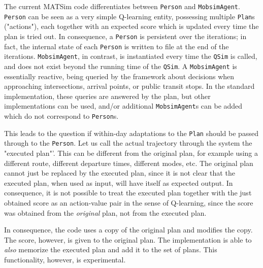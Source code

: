 
The current MATSim code differentiates between \lstinline$Person$ and \lstinline$MobsimAgent$.  
%
\lstinline$Person$ can be seen as a very simple Q-learning entity, possessing multiple \lstinline$Plan$s ("actions"), each together with an expected score which is updated every time the plan is tried out. In consequence, a \lstinline$Person$ is persistent over the iterations; in fact, the internal state of each \lstinline$Person$ is written to file at the end of the iterations.
%
\lstinline$MobsimAgent$, in contrast, is instantiated every time the \lstinline$QSim$ is called, and does not exist beyond the running time of the \lstinline$QSim$. A \lstinline$MobsimAgent$ is essentially reactive, being queried by the framework about decisions when approaching intersections, arrival points, or public transit stops. In the standard implementation, these queries are answered by the plan, but other implementations can be used, and/or additional \lstinline$MobsimAgent$s can be added which do not correspond to \lstinline$Person$s.


This leads to the question if within-day adaptations to the \lstinline$Plan$ should be passed through to the \lstinline$Person$. Let us call the actual trajectory through the system the "executed plan"'.  This can be different from the original plan, for example using a different route, different departure times, different modes, etc. The original plan cannot just be replaced by the executed plan, since it is not clear that the executed plan, when used as input, will have itself as expected output. In consequence, it is not possible to treat the executed plan together with the just obtained score as an action-value pair in the sense of Q-learning, since the score was obtained from the \emph{original} plan, not from the executed plan.

In consequence, the code uses a copy of the original plan and modifies the copy. The score, however, is given to the original plan. The implementation is able to 
% 
\emph{also} memorize the executed plan and add it to the set of plans. This functionality, however, is experimental.

